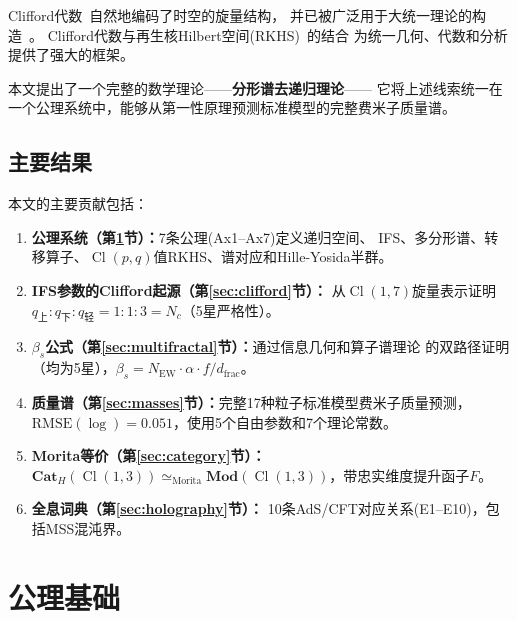 \documentclass[12pt,a4paper]{ctexart}
\newcommand{\Cl}{\operatorname{Cl}}
\newcommand{\Cat}{\mathbf{Cat}}
\newcommand{\Mod}{\mathbf{Mod}}
\begin{document}
Clifford代数~\cite{clifford}自然地编码了时空的旋量结构，
并已被广泛用于大统一理论的构造~\cite{pati-salam}。
Clifford代数与再生核Hilbert空间(RKHS)~\cite{aronszajn}的结合
为统一几何、代数和分析提供了强大的框架。

本文提出了一个完整的数学理论——\textbf{分形谱去递归理论}——
它将上述线索统一在一个公理系统中，能够从第一性原理预测标准模型的完整费米子质量谱。

\subsection{主要结果}

本文的主要贡献包括：

\begin{enumerate}
  \item \textbf{公理系统（第\ref{sec:axioms}节）：}7条公理(Ax1--Ax7)定义递归空间、
  IFS、多分形谱、转移算子、$\Cl(p,q)$值RKHS、谱对应和Hille-Yosida半群。

  \item \textbf{IFS参数的Clifford起源（第\ref{sec:clifford}节）：}
  从$\Cl(1,7)$旋量表示证明$q_{\text{上}}:q_{\text{下}}:q_{\text{轻}} = 1:1:3 = N_c$（5星严格性）。

  \item \textbf{$\beta_s$公式（第\ref{sec:multifractal}节）：}通过信息几何和算子谱理论
  的双路径证明（均为5星），$\beta_s = N_{\text{EW}} \cdot \alpha \cdot f / d_{\text{frac}}$。

  \item \textbf{质量谱（第\ref{sec:masses}节）：}完整17种粒子标准模型费米子质量预测，
  $\text{RMSE}(\log) = 0.051$，使用5个自由参数和7个理论常数。

  \item \textbf{Morita等价（第\ref{sec:category}节）：}
  $\Cat_H(\Cl(1,3)) \simeq_{\text{Morita}} \Mod(\Cl(1,3))$，带忠实维度提升函子$F$。

  \item \textbf{全息词典（第\ref{sec:holography}节）：}
  10条AdS/CFT对应关系(E1--E10)，包括MSS混沌界。
\end{enumerate}

\section{公理基础}
\label{sec:axioms}
\end{document}
